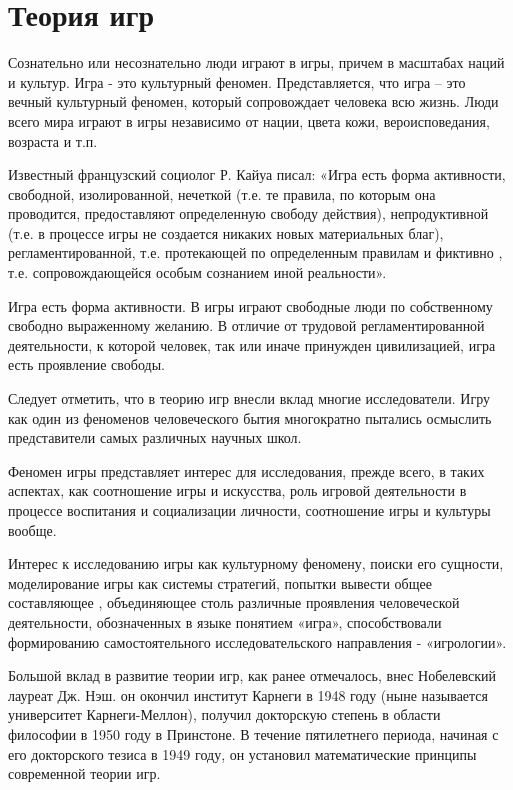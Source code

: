 \documentclass[14pt, a4paper]{extarticle}
\let\stdsection\section
\renewcommand\section{\newpage\stdsection}
\begin{document}
\section{Теория игр}
Сознательно или несознательно люди играют в игры, причем в масштабах наций и
культур. Игра - это культурный феномен.
Представляется, что игра – это вечный культурный феномен, который сопровождает
человека всю жизнь. Люди всего мира играют в игры независимо от нации, цвета
кожи, вероисповедания, возраста и т.п.

Известный французский социолог Р. Кайуа писал: «Игра есть форма активности,
свободной, изолированной, нечеткой (т.е. те правила, по которым она
проводится, предоставляют определенную свободу действия), непродуктивной
(т.е. в процессе игры не создается никаких новых материальных благ),
регламентированной, т.е. протекающей по определенным правилам и фиктивно
, т.е. сопровождающейся особым сознанием иной реальности»\cite{ka07}.

Игра есть форма активности. В игры играют свободные люди по собственному
свободно выраженному желанию. В отличие от трудовой регламентированной
деятельности, к которой человек, так или иначе принужден цивилизацией, игра
есть проявление свободы.

Следует отметить, что в теорию игр внесли вклад многие исследователи. 
Игру как один из феноменов человеческого бытия многократно пытались
осмыслить представители самых различных научных школ.

Феномен игры представляет интерес для исследования, прежде всего, в таких
аспектах, как соотношение игры и искусства, роль игровой деятельности в
процессе воспитания и социализации личности, соотношение игры и культуры
вообще.

Интерес к исследованию игры как культурному феномену, поиски его сущности,
моделирование игры как системы стратегий, попытки вывести общее составляющее ,
объединяющее столь различные проявления человеческой деятельности, обозначенных
в языке понятием «игра», способствовали формированию самостоятельного
исследовательского направления - «игрологии»\cite{ap07}.

Большой вклад в развитие теории игр, как ранее отмечалось, внес Нобелевский
лауреат Дж. Нэш. он окончил институт Карнеги в 1948 году (ныне называется
университет Карнеги-Меллон), получил докторскую степень в области философии в
1950 году в Принстоне\cite{jn50d}. В течение пятилетнего периода, начиная с его
докторского тезиса в 1949 году, он установил математические принципы
современной теории игр.
\end{document}
